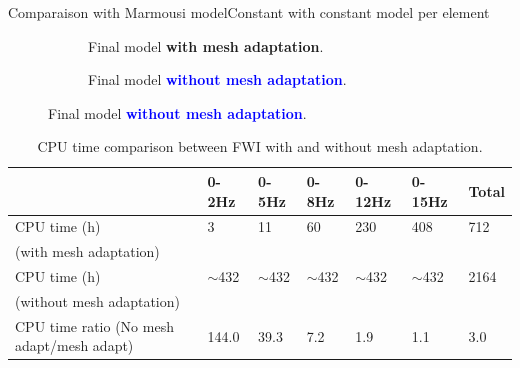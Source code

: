 \begin{frame}[noframenumbering]{Comparaison with Marmousi model}{Constant with constant model per element}
  \vspace{-0.8cm}
  \setlength{\modelwidth}{6.0cm}
  \begin{figure}[!htbp]
    \renewcommand{\modelfile}{image/mesh_adapt/adapt_vp_80}
     \begin{subfigure}[!htbp]{0.5\textwidth}
        \vspace{0.5cm}
        \hspace{-0.5cm}
         \centering
         
                  \caption*{Final model \textcolor{\mygreen}{\textbf{with mesh adaptation}}.}         \label{marmousi_mesh_padapt}
     \end{subfigure}
     \hspace{-1cm}
     \renewcommand{\modelfile}{image/mesh_adapt/classic_vp_80}
     \renewcommand{\cmapmin}{1500}
     \renewcommand{\cmapmax}{5000}
     \begin{subfigure}[!htbp]{0.5\textwidth}
         \centering
         
         \vspace{-0.6cm}
         \caption*{Final model \textcolor{blue}{\textbf{without mesh adaptation}}.}
     \end{subfigure}
     \end{figure}

     \scriptsize
\begin{table}[!htbp]
\begin{tabular}{|m{3cm}|l|l|l|l|l|l|}
\hline
& 0-2Hz     & 0-5Hz     & 0-8Hz     & 0-12Hz    & 0-15Hz    & Total \\ \hline
\rowcolor{green!30}
CPU time (h)          & 3         & 11        & 60        & 230       & 408       & 712   \\
\rowcolor{green!30}
(with mesh adaptation)          &          &         &         &        &        &    \\ \hline
\rowcolor{blue!30}
CPU time (h)       & $\sim$432 & $\sim$432 & $\sim$432 & $\sim$432 & $\sim$432 & 2164  \\
\rowcolor{blue!30}
 (without mesh adaptation)       &  &  &  &  &  &   \\ \hline
CPU time ratio \newline (No mesh adapt/mesh adapt)  &  144.0   &    39.3    &   7.2     &    1.9    &   1.1     & \cellcolor{red!30} 3.0   \\ \hline
\end{tabular}
\caption{CPU time comparison between FWI with and without mesh adaptation.}
\label{cpu_tab_1}
\end{table}
\end{frame}



